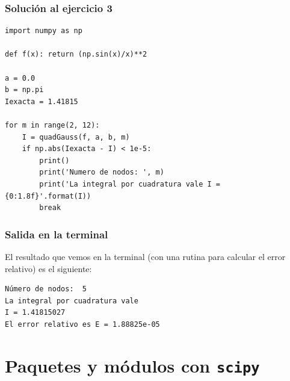 \begin{frame}
\frametitle{Solución al ejercicio 3}
\begin{lstlisting}[caption=Código para la fórmula Gauss-Legendre, style=FormattedNumber, basicstyle=\linespread{1.1}\ttfamily=\tiny, columns=fullflexible]
import numpy as np

def f(x): return (np.sin(x)/x)**2

a = 0.0
b = np.pi
Iexacta = 1.41815

for m in range(2, 12):
	I = quadGauss(f, a, b, m)
	if np.abs(Iexacta - I) < 1e-5:
		print()
		print('Numero de nodos: ', m)
		print('La integral por cuadratura vale I = {0:1.8f}'.format(I))
		break
\end{lstlisting}
\end{frame}
\begin{frame}[fragile]
\frametitle{Salida en la terminal}
El resultado que vemos en la terminal (con una rutina para calcular el error relativo) es el siguiente:
\begin{verbatim}
Número de nodos:  5
La integral por cuadratura vale 
I = 1.41815027
El error relativo es E = 1.88825e-05
\end{verbatim}
\end{frame}
\section{Paquetes y módulos con \texttt{scipy}}
